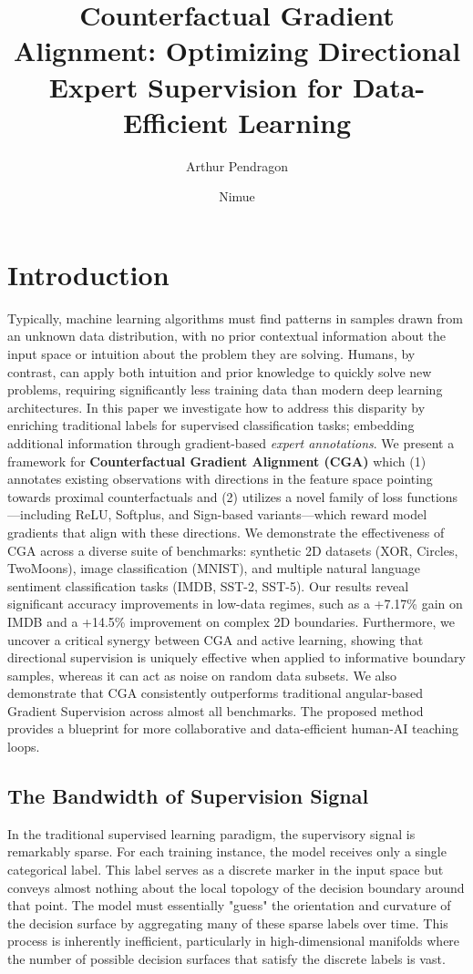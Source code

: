 \documentclass[sigconf,anonymous]{aamas}
\title[Counterfactual Gradient Alignment]{Counterfactual Gradient Alignment: Optimizing Directional Expert Supervision for Data-Efficient Learning}
\author{Arthur Pendragon}
\affiliation{
  \institution{Camelot Castle}
  \city{Camelot}
  \country{United Kingdom}}
\author{Nimue}
\affiliation{
  \institution{The Lady's Lake}
  \city{Avalon}
  \country{United Kingdom}}
\begin{document}
\pagestyle{fancy}
\fancyhead{}

\maketitle 


\section{Introduction}
Typically, machine learning algorithms must find patterns in samples drawn from an unknown data distribution, with no prior contextual information about the input space or intuition about the problem they are solving. Humans, by contrast, can apply both intuition and prior knowledge to quickly solve new problems, requiring significantly less training data than modern deep learning architectures. In this paper we investigate how to address this disparity by enriching traditional labels for supervised classification tasks; embedding additional information through gradient-based \emph{expert annotations}. We present a framework for \textbf{Counterfactual Gradient Alignment (CGA)} which (1) annotates existing observations with directions in the feature space pointing towards proximal counterfactuals and (2) utilizes a novel family of loss functions---including ReLU, Softplus, and Sign-based variants---which reward model gradients that align with these directions. We demonstrate the effectiveness of CGA across a diverse suite of benchmarks: synthetic 2D datasets (XOR, Circles, TwoMoons), image classification (MNIST), and multiple natural language sentiment classification tasks (IMDB, SST-2, SST-5). Our results reveal significant accuracy improvements in low-data regimes, such as a +7.17\% gain on IMDB and a +14.5\% improvement on complex 2D boundaries. Furthermore, we uncover a critical synergy between CGA and active learning, showing that directional supervision is uniquely effective when applied to informative boundary samples, whereas it can act as noise on random data subsets. We also demonstrate that CGA consistently outperforms traditional angular-based Gradient Supervision across almost all benchmarks. The proposed method provides a blueprint for more collaborative and data-efficient human-AI teaching loops.

\subsection{The Bandwidth of Supervision Signal}
In the traditional supervised learning paradigm, the supervisory signal is remarkably sparse. For each training instance, the model receives only a single categorical label. This label serves as a discrete marker in the input space but conveys almost nothing about the local topology of the decision boundary around that point. The model must essentially "guess" the orientation and curvature of the decision surface by aggregating many of these sparse labels over time. This process is inherently inefficient, particularly in high-dimensional manifolds where the number of possible decision surfaces that satisfy the discrete labels is vast.
\end{document}

